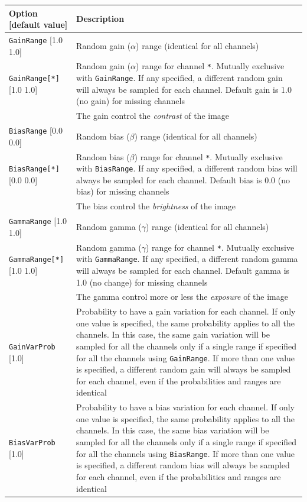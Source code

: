 \documentclass[a4paper,11pt,oneside]{article}
\begin{document}
\begin{center}
 \begin{tabular}{| p{5cm} | p{10cm} | }
 \hline
 Option [default value] & Description\\
 \hline\hline
  \lstinline!GainRange! [1.0 1.0] & Random gain ($\alpha$) range (identical for all channels) \\
  \lstinline!GainRange[*]! [1.0 1.0] & Random gain ($\alpha$) range for channel \lstinline!*!. Mutually exclusive with \lstinline!GainRange!. If any specified, a different random gain will always be sampled for each channel. Default gain is 1.0 (no gain) for missing channels \\
   & The gain control the \emph{contrast} of the image \\
  \lstinline!BiasRange! [0.0 0.0] & Random bias ($\beta$) range (identical for all channels) \\
  \lstinline!BiasRange[*]! [0.0 0.0] & Random bias ($\beta$) range for channel \lstinline!*!. Mutually exclusive with \lstinline!BiasRange!. If any specified, a different random bias will always be sampled for each channel. Default bias is 0.0 (no bias) for missing channels \\
   & The bias control the \emph{brightness} of the image \\
  \lstinline!GammaRange! [1.0 1.0] & Random gamma ($\gamma$) range (identical for all channels) \\
  \lstinline!GammaRange[*]! [1.0 1.0] & Random gamma ($\gamma$) range for channel \lstinline!*!. Mutually exclusive with \lstinline!GammaRange!. If any specified, a different random gamma will always be sampled for each channel. Default gamma is 1.0 (no change) for missing channels \\
   & The gamma control more or less the \emph{exposure} of the image \\
  \lstinline!GainVarProb! [1.0] & Probability to have a gain variation for each channel. If only one value is specified, the same probability applies to all the channels. In this case, the same gain variation will be sampled for all the channels only if a single range if specified for all the channels using \lstinline!GainRange!. If more than one value is specified, a different random gain will always be sampled for each channel, even if the probabilities and ranges are identical \\
  \lstinline!BiasVarProb! [1.0] & Probability to have a bias variation for each channel. If only one value is specified, the same probability applies to all the channels. In this case, the same bias variation will be sampled for all the channels only if a single range if specified for all the channels using \lstinline!BiasRange!. If more than one value is specified, a different random bias will always be sampled for each channel, even if the probabilities and ranges are identical \\

\end{tabular}
\end{center}
\end{document}

